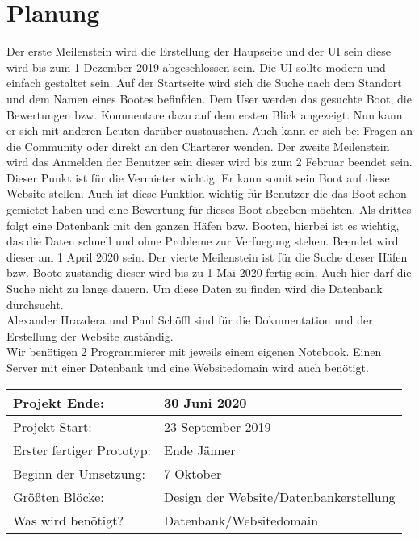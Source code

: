 \documentclass[12pt]{article}
\theoremstyle{definition}
\begin{document}
\section{Planung}
Der erste Meilenstein wird die Erstellung der Haupseite und der UI sein diese wird bis zum 1 Dezember 2019 abgeschlossen sein.
Die UI sollte modern und einfach gestaltet sein. Auf der Startseite wird sich die Suche nach dem Standort und dem Namen eines Bootes befinfden. Dem User werden das gesuchte Boot, die Bewertungen bzw. Kommentare dazu auf dem ersten Blick angezeigt. Nun kann er sich mit anderen Leuten darüber austauschen. Auch kann er sich bei Fragen an die Community oder direkt an den Charterer wenden. 
Der zweite Meilenstein wird das Anmelden der Benutzer sein dieser wird bis zum 2 Februar beendet sein. Dieser Punkt ist für die Vermieter wichtig. Er kann somit sein Boot auf diese Website stellen. Auch ist diese Funktion wichtig für Benutzer die das Boot schon gemietet haben und eine Bewertung für dieses Boot abgeben möchten.
Als drittes folgt eine Datenbank mit den ganzen Häfen bzw. Booten, hierbei ist es wichtig, das die Daten schnell und ohne Probleme zur Verfuegung stehen. Beendet wird dieser am 1 April 2020 sein. 
Der vierte Meilenstein ist für die Suche dieser Häfen bzw. Boote zuständig dieser wird bis zu 1 Mai 2020 fertig sein. Auch hier darf die Suche nicht zu lange dauern. Um diese Daten zu finden wird die Datenbank durchsucht.
\\ Alexander Hrazdera und Paul Schöffl sind für die Dokumentation und der Erstellung der Website zuständig.\\ Wir benötigen 2 Programmierer mit jeweils einem eigenen Notebook. Einen Server mit einer Datenbank und eine Websitedomain wird auch benötigt.

\newcommand{\projektend}{30 Juni 2020}
\newcommand{\projectstart}{23 September 2019}
\newcommand{\firstresult}{Ende Jänner}
\newcommand{\beginofprog}{7 Oktober}
\newcommand{\bigBlocks}{Design der Website/Datenbankerstellung}
\newcommand{\whatisneeded}{Datenbank/Websitedomain}

\begin{flushleft} 
\begin{tabular}{|l|l|}
\hline
Projekt Ende: & \projektend \\ \hline
Projekt Start: & \projectstart \\ \hline
Erster fertiger Prototyp: & \firstresult \\ \hline
Beginn der Umsetzung: & \beginofprog \\ \hline
Größten Blöcke: & \bigBlocks \\ \hline
Was wird benötigt? & \whatisneeded \\ \hline
\end{tabular}
\end{flushleft}
\cite{wikipedia_2016}
{}

\end{document}
